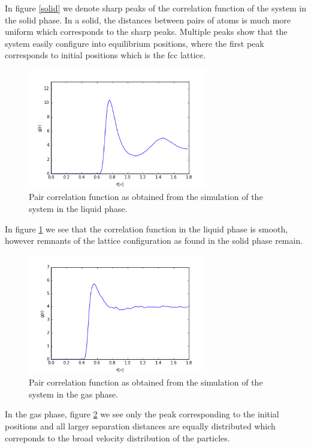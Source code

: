 \documentclass[11pt]{article}
\begin{document}
In figure \ref{solid} we denote sharp peaks of the correlation function of the system in the solid phase. In a solid, the distances between pairs of atoms is much more uniform which corresponds to the sharp peaks. Multiple peaks show that the system easily configure into equilibrium positions, where the first peak corresponds to initial positions which is the fcc lattice. 

\begin{figure}[h!]
\centering
\includegraphics[width=0.7\textwidth]{correlation_liquid}
\caption{Pair correlation function as obtained from the simulation of the system in the liquid phase.}\label{liquid}
\end{figure}

In figure \ref{liquid} we see that the correlation function in the liquid phase is smooth, however remnants of the lattice configuration as found in the solid phase remain.

\begin{figure}[h!]
\centering
\includegraphics[width=0.7\textwidth]{correlation_gas}
\caption{Pair correlation function as obtained from the simulation of the system in the gas phase.}\label{gas}
\end{figure}

 In the gas phase, figure \ref{gas} we see only the peak corresponding to the initial positions and all larger separation distances are equally distributed which correponds to the broad velocity distribution of the particles.
\end{document}
